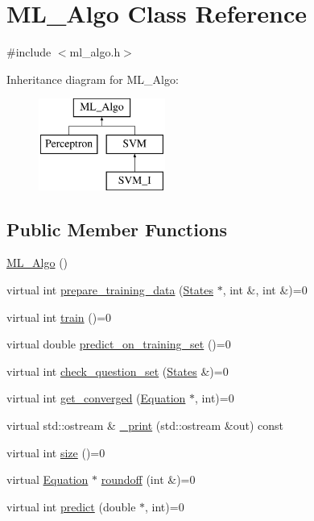 \hypertarget{classML__Algo}{}\section{M\+L\+\_\+\+Algo Class Reference}
\label{classML__Algo}


{\ttfamily \#include $<$ml\+\_\+algo.\+h$>$}

Inheritance diagram for M\+L\+\_\+\+Algo\+:\begin{figure}[H]
\begin{center}
\leavevmode
\includegraphics[height=3.000000cm]{classML__Algo}
\end{center}
\end{figure}
\subsection*{Public Member Functions}
\begin{DoxyCompactItemize}
\item 
\hyperlink{classML__Algo_a7b8c13ce9739e50cc6f6d097469f0326}{M\+L\+\_\+\+Algo} ()
\item 
virtual int \hyperlink{classML__Algo_aaecc3e3fb875eea2867dcac24bc1e550}{prepare\+\_\+training\+\_\+data} (\hyperlink{classStates}{States} $\ast$, int \&, int \&)=0
\item 
virtual int \hyperlink{classML__Algo_a0a5d241191d4249c60a40d966fb19aee}{train} ()=0
\item 
virtual double \hyperlink{classML__Algo_a39dd640e7c910becf611b9265843ac77}{predict\+\_\+on\+\_\+training\+\_\+set} ()=0
\item 
virtual int \hyperlink{classML__Algo_aa6b2dd6e3c5571b7bebe0d5f3de5483b}{check\+\_\+question\+\_\+set} (\hyperlink{classStates}{States} \&)=0
\item 
virtual int \hyperlink{classML__Algo_a51cd9c90baae617c40d8495985f03a5e}{get\+\_\+converged} (\hyperlink{classEquation}{Equation} $\ast$, int)=0
\item 
virtual std\+::ostream \& \hyperlink{classML__Algo_ad689e5642c5db0971c53909b52cc67d4}{\+\_\+print} (std\+::ostream \&out) const 
\item 
virtual int \hyperlink{classML__Algo_a8650c3894c1992492f8bc86edf1b3ffd}{size} ()=0
\item 
virtual \hyperlink{classEquation}{Equation} $\ast$ \hyperlink{classML__Algo_ad847559865d5e4208371a00fe1cbe12e}{roundoff} (int \&)=0
\item 
virtual int \hyperlink{classML__Algo_a8c2a89155672a87131161c5dcdfa1c5a}{predict} (double $\ast$, int)=0
\end{DoxyCompactItemize}
